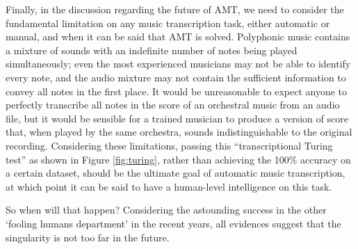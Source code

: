 Finally, in the discussion regarding the future of AMT, we need to consider the fundamental limitation on any music transcription task, either automatic or manual, and when it can be said that AMT is solved.
Polyphonic music contains a mixture of sounds with an indefinite number of notes being played simultaneously; even the most experienced musicians may not be able to identify every note, and the audio mixture may not contain the sufficient information to convey all notes in the first place.
It would be unreasonable to expect anyone to perfectly transcribe all notes in the score of an orchestral music from an audio file, but it would be sensible for a trained musician to produce a version of score that, when played by the same orchestra, sounds indistinguishable to the original recording.
Considering these limitations, passing this ``transcriptional Turing test'' as shown in Figure \ref{fig:turing}, rather than achieving the 100\% accuracy on a certain dataset, should be the ultimate goal of automatic music transcription, at which point it can be said to have a human-level intelligence on this task.

So when will that happen? Considering the astounding success in the other `fooling humans department' in the recent years, all evidences suggest that the singularity is not too far in the future.

\pagebreak